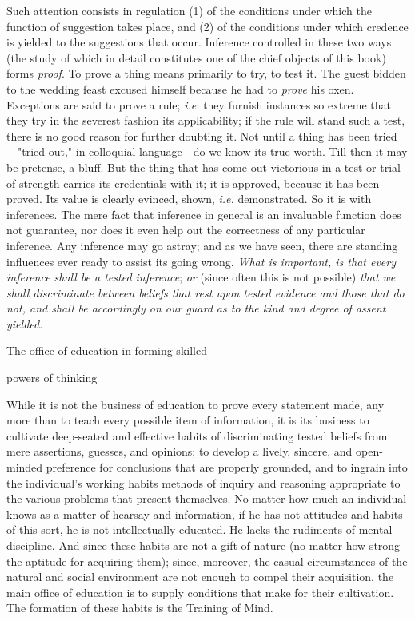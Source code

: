 \documentclass[letterpaper]{book}
\begin{document}
Such attention consists in regulation (1) of the conditions under which
the function of suggestion takes place, and (2) of the conditions under
which credence is yielded to the suggestions that occur. Inference
controlled in these two ways (the study of which in detail constitutes
one of the chief objects of this book) forms \emph{proof}. To prove a
thing means primarily to try, to test it. The guest bidden to the
wedding feast excused himself because he had to \emph{prove} his oxen.
Exceptions are said to prove a rule; \emph{i.e.} they furnish instances
so extreme that they try in the severest fashion its applicability; if
the rule will stand such a test, there is no good reason for further
doubting it. Not until a thing has been tried---"tried out," in
colloquial language---do we know its true worth. Till then it may be
pretense, a bluff. But the thing that has come out victorious in a test
or trial of strength carries its credentials with it; it is approved,
because it has been proved. Its value is clearly evinced, shown,
\emph{i.e.} demonstrated. So it is with inferences. The mere fact that
inference in general is an invaluable function does not guarantee, nor
does it even help out the correctness of any particular inference. Any
inference may go astray; and as we have seen, there are standing
influences ever ready to assist its going wrong. \emph{What is
important, is that every inference shall be a tested inference};
\emph{or} (since often this is not possible) \emph{that we shall
discriminate between beliefs that rest upon tested evidence and those
that do not, and shall be accordingly on our guard as to the kind and
degree of assent yielded}.

The office of education in forming skilled

powers of thinking

While it is not the business of education to prove every statement made,
any more than to teach every possible item of information, it is its
business to
cultivate
deep-seated and effective habits of discriminating tested beliefs from
mere assertions, guesses, and opinions; to develop a lively, sincere,
and open-minded preference for conclusions that are properly grounded,
and to ingrain into the individual's working habits methods of inquiry
and reasoning appropriate to the various problems that present
themselves. No matter how much an individual knows as a matter of
hearsay and information, if he has not attitudes and habits of this
sort, he is not intellectually educated. He lacks the rudiments of
mental discipline. And since these habits are not a gift of nature (no
matter how strong the aptitude for acquiring them); since, moreover, the
casual circumstances of the natural and social environment are not
enough to compel their acquisition, the main office of education is to
supply conditions that make for their cultivation. The formation of
these habits is the Training of
Mind.
\end{document}
